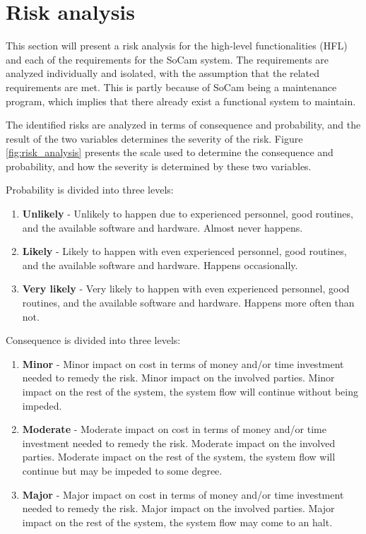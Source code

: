 
\section{Risk analysis}
\label{section:risk_analysis}

This section will present a risk analysis for the high-level functionalities (HFL) and each of the requirements for the SoCam system. The requirements are analyzed individually and isolated, with the assumption that the related requirements are met. This is partly because of SoCam being a maintenance program, which implies that there already exist a functional system to maintain. 

The identified risks are analyzed in terms of consequence and probability, and the result of the two variables determines the severity of the risk.  Figure \ref{fig:risk_analysis} presents the scale used to determine the consequence and probability, and how the severity is determined by these two variables. \newline

\noindent Probability is divided into three levels:

\begin{enumerate}
    \item \textbf{Unlikely} - Unlikely to happen due to experienced personnel, good routines, and the available software and hardware. Almost never happens. 
    \item \textbf{Likely} - Likely to happen with even experienced personnel, good routines, and the available software and hardware. Happens occasionally.  
    \item \textbf{Very likely} - Very likely to happen with even experienced personnel, good routines, and the available software and hardware. Happens more often than not.
\end{enumerate}

\noindent Consequence is divided into three levels:

\begin{enumerate}
    \item \textbf{Minor} - Minor impact on cost in terms of money and/or time investment needed to remedy the risk. Minor impact on the involved parties. Minor impact on the rest of the system, the system flow will continue without being impeded. 
    \item \textbf{Moderate} - Moderate impact on cost in terms of money and/or time investment needed to remedy the risk. Moderate impact on the involved parties. Moderate impact on the rest of the system, the system flow will continue but may be impeded to some degree.
    \item \textbf{Major} - Major impact on cost in terms of money and/or time investment needed to remedy the risk. Major impact on the involved parties. Major impact on the rest of the system, the system flow may come to an halt.
\end{enumerate}

